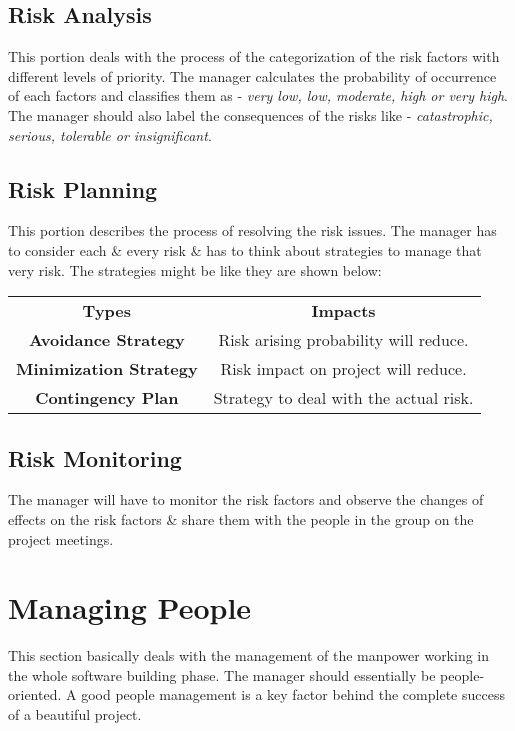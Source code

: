 \documentclass[dvips,12pt]{article}
\begin{document}
\subsection{Risk Analysis}
This portion deals with the process of the categorization of the risk factors with different levels of priority. The manager calculates the probability of occurrence of each factors and classifies them as - \textit{very low, low, moderate, high or very high}. The manager should also label the consequences of the risks like - \textit{catastrophic, serious, tolerable or insignificant}.

\subsection{Risk Planning}
This portion describes the process of resolving the risk issues. The manager  has to consider each \& every risk \& has to think about strategies to manage that very risk. The strategies might be like they are shown below:
\begin{center}
\begin{tabular}{ |c|c| } 
 \hline
 \textbf{Types} & \textbf{Impacts} \\ 
 \textbf{Avoidance Strategy} & Risk arising probability will reduce. \\ 
 \textbf{Minimization Strategy} & Risk impact on project will reduce. \\
 \textbf{Contingency Plan} & Strategy to deal with the actual risk. \\  
 \hline
\end{tabular}
\end{center}

\subsection{Risk Monitoring}
The manager will have to monitor the risk factors and observe the changes of effects on the risk factors \& share them with the people in the group on the project meetings.

\section{Managing People}
This section basically deals with the management of the manpower working in the whole software building phase. The manager should essentially be people-oriented. A good people management is a key factor behind the complete success of a beautiful project.
\end{document}
